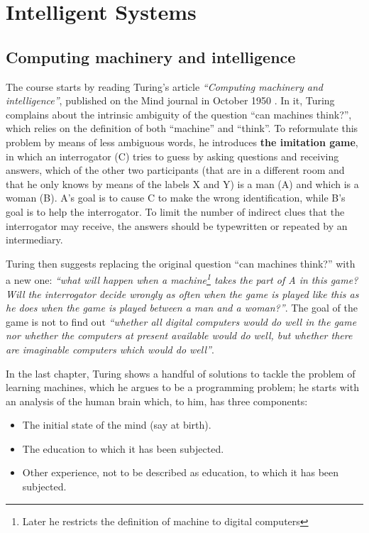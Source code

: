 \chapter{Intelligent Systems}
\section{Computing machinery and intelligence}
The course starts by reading Turing's article \textit{``Computing machinery and intelligence''}, published on the Mind journal in October 1950 \cite{10.1093/mind/LIX.236.433}. In it, Turing complains about the intrinsic ambiguity of the question ``can machines think?'', which relies on the definition of both ``machine'' and ``think''. To reformulate this problem by means of less ambiguous words, he introduces \textbf{the imitation game}, in which an interrogator (C) tries to guess by asking questions and receiving answers, which of the other two participants (that are in a different room and that he only knows by means of the labels X and Y) is a man (A) and which is a woman (B). A's goal is to cause C to make the wrong identification, while B's goal is to help the interrogator. To limit the number of indirect clues that the interrogator may receive, the answers should be typewritten or repeated by an intermediary.

Turing then suggests replacing the original question ``can machines think?'' with a new one: \textit{``what will happen when a machine\footnote{Later he restricts the definition of machine to digital computers} takes the part of A in this game? Will the interrogator decide wrongly as often when the game is played like this as he does when the game is played between a man and a woman?''}. The goal of the game is not to find out \textit{``whether all digital computers would do well in the game nor whether the computers at present available would do well, but whether there are imaginable computers which would do well''}.

In the last chapter, Turing shows a handful of solutions to tackle the problem of learning machines, which he argues to be a programming problem; he starts with an analysis of the human brain which, to him, has three components:

\begin{itemize}
    \item The initial state of the mind (say at birth).
    \item The education to which it has been subjected.
    \item Other experience, not to be described as education, to which it has been subjected.
\end{itemize}

